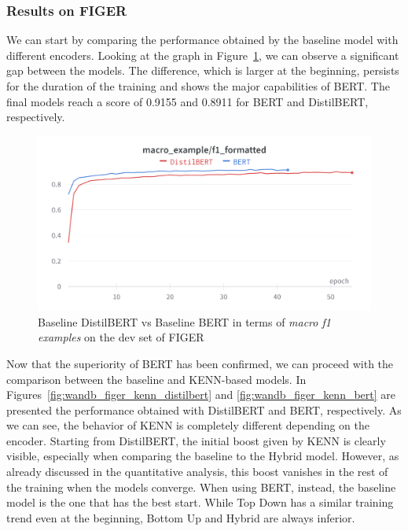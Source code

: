 \subsubsection{Results on FIGER}
We can start by comparing the performance obtained by the baseline model with different encoders. Looking at the graph in Figure~\ref{fig:wandb_figer_baseline_distilbert_vs_bert}, we can observe a significant gap between the models. The difference, which is larger at the beginning, persists for the duration of the training and shows the major capabilities of BERT. The final models reach a score of 0.9155 and 0.8911 for BERT and DistilBERT, respectively.
\begin{figure}[bth]
    \centering
    \includegraphics[width=.8\linewidth]{figures/wandb_figer_baseline_distilbert_vs_bert.png}
    \caption{Baseline DistilBERT vs Baseline BERT in terms of \textit{macro f1 examples} on the dev set of FIGER}
    \label{fig:wandb_figer_baseline_distilbert_vs_bert}
\end{figure}

Now that the superiority of BERT has been confirmed, we can proceed with the comparison between the baseline and KENN-based models. In Figures~\ref{fig:wandb_figer_kenn_distilbert} and \ref{fig:wandb_figer_kenn_bert} are presented the performance obtained with DistilBERT and BERT, respectively. As we can see, the behavior of KENN is completely different depending on the encoder. Starting from DistilBERT, the initial boost given by KENN is clearly visible, especially when comparing the baseline to the Hybrid model. However, as already discussed in the quantitative analysis, this boost vanishes in the rest of the training when the models converge. When using BERT, instead, the baseline model is the one that has the best start. While Top Down has a similar training trend even at the beginning, Bottom Up and Hybrid are always inferior.


